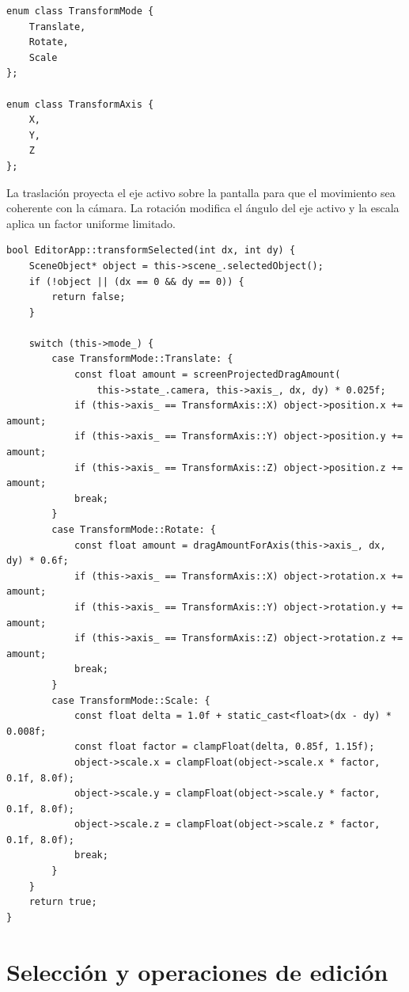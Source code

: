\documentclass[a4paper,12pt]{article}
\begin{document}

\begin{lstlisting}
enum class TransformMode {
    Translate,
    Rotate,
    Scale
};

enum class TransformAxis {
    X,
    Y,
    Z
};
\end{lstlisting}

La traslación proyecta el eje activo sobre la pantalla para que el movimiento sea coherente con la cámara. La rotación modifica el ángulo del eje activo y la escala aplica un factor uniforme limitado.

\begin{lstlisting}
bool EditorApp::transformSelected(int dx, int dy) {
    SceneObject* object = this->scene_.selectedObject();
    if (!object || (dx == 0 && dy == 0)) {
        return false;
    }

    switch (this->mode_) {
        case TransformMode::Translate: {
            const float amount = screenProjectedDragAmount(
                this->state_.camera, this->axis_, dx, dy) * 0.025f;
            if (this->axis_ == TransformAxis::X) object->position.x += amount;
            if (this->axis_ == TransformAxis::Y) object->position.y += amount;
            if (this->axis_ == TransformAxis::Z) object->position.z += amount;
            break;
        }
        case TransformMode::Rotate: {
            const float amount = dragAmountForAxis(this->axis_, dx, dy) * 0.6f;
            if (this->axis_ == TransformAxis::X) object->rotation.x += amount;
            if (this->axis_ == TransformAxis::Y) object->rotation.y += amount;
            if (this->axis_ == TransformAxis::Z) object->rotation.z += amount;
            break;
        }
        case TransformMode::Scale: {
            const float delta = 1.0f + static_cast<float>(dx - dy) * 0.008f;
            const float factor = clampFloat(delta, 0.85f, 1.15f);
            object->scale.x = clampFloat(object->scale.x * factor, 0.1f, 8.0f);
            object->scale.y = clampFloat(object->scale.y * factor, 0.1f, 8.0f);
            object->scale.z = clampFloat(object->scale.z * factor, 0.1f, 8.0f);
            break;
        }
    }
    return true;
}
\end{lstlisting}

\section{Selección y operaciones de edición}
\end{document}
